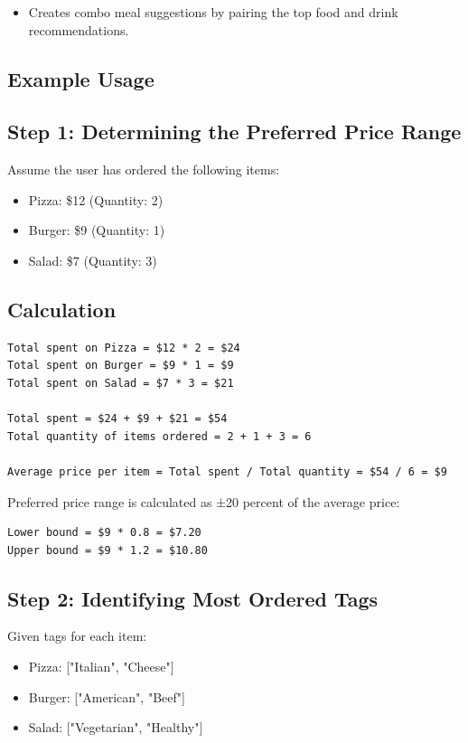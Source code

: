 \begin{itemize}
    \item Creates combo meal suggestions by pairing the  top food and drink recommendations.
\end{itemize}

\subsection{Example Usage}
\subsection*{Step 1: Determining the Preferred Price Range}

Assume the user has ordered the following items:

\begin{itemize}
    \item Pizza: \$12 (Quantity: 2)
    \item Burger: \$9 (Quantity: 1)
    \item Salad: \$7 (Quantity: 3)
\end{itemize}

\subsection*{Calculation}

\begin{verbatim}
Total spent on Pizza = $12 * 2 = $24
Total spent on Burger = $9 * 1 = $9
Total spent on Salad = $7 * 3 = $21

Total spent = $24 + $9 + $21 = $54
Total quantity of items ordered = 2 + 1 + 3 = 6

Average price per item = Total spent / Total quantity = $54 / 6 = $9
\end{verbatim}

Preferred price range is calculated as ±20 percent of the average price:
\begin{verbatim}
Lower bound = $9 * 0.8 = $7.20
Upper bound = $9 * 1.2 = $10.80
\end{verbatim}

\subsection*{Step 2: Identifying Most Ordered Tags}

Given tags for each item:
\begin{itemize}
    \item Pizza: ["Italian", "Cheese"]
    \item Burger: ["American", "Beef"]
    \item Salad: ["Vegetarian", "Healthy"]
\end{itemize}

